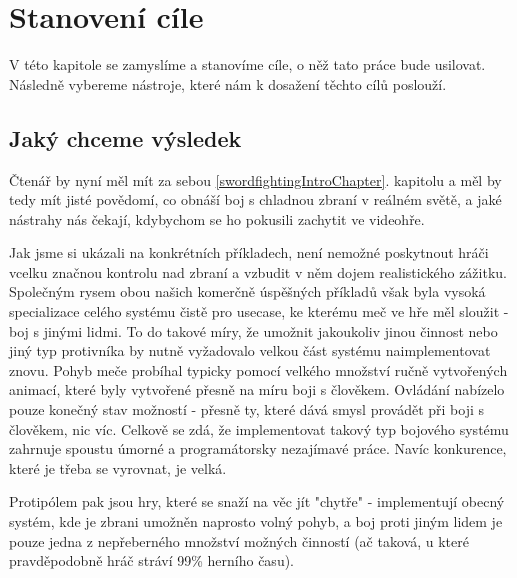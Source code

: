 \chapter{Stanovení cíle}

V této kapitole se zamyslíme a stanovíme cíle, o něž tato práce bude usilovat. Následně vybereme nástroje, které nám k dosažení těchto cílů poslouží.  


\section{Jaký chceme výsledek}

Čtenář by nyní měl mít za sebou \ref{swordfightingIntroChapter}. kapitolu a měl by tedy mít jisté povědomí, co obnáší boj s chladnou zbraní v reálném světě, a jaké nástrahy nás čekají, kdybychom se ho pokusili zachytit ve videohře. 

Jak jsme si ukázali na konkrétních příkladech, není nemožné poskytnout hráči vcelku značnou kontrolu nad zbraní a vzbudit v něm dojem realistického zážitku. Společným rysem obou našich komerčně úspěšných příkladů však byla vysoká specializace celého systému čistě pro usecase, ke kterému meč ve hře měl sloužit - boj s jinými lidmi. To do takové míry, že umožnit jakoukoliv jinou činnost nebo jiný typ protivníka by nutně vyžadovalo velkou část systému naimplementovat znovu. Pohyb meče probíhal typicky pomocí velkého množství ručně vytvořených animací, které byly vytvořené přesně na míru boji s člověkem. Ovládání nabízelo pouze konečný stav možností - přesně ty, které dává smysl provádět při boji s člověkem, nic víc. Celkově se zdá, že implementovat takový typ bojového systému zahrnuje spoustu úmorné a programátorsky nezajímavé práce. Navíc konkurence, které je třeba se vyrovnat, je velká.

Protipólem pak jsou hry, které se snaží na věc jít "chytře" - implementují obecný systém, kde je zbrani umožněn naprosto volný pohyb, a boj proti jiným lidem je pouze jedna z nepřeberného množství možných činností (ač taková, u které pravděpodobně hráč stráví 99\% herního času).   


